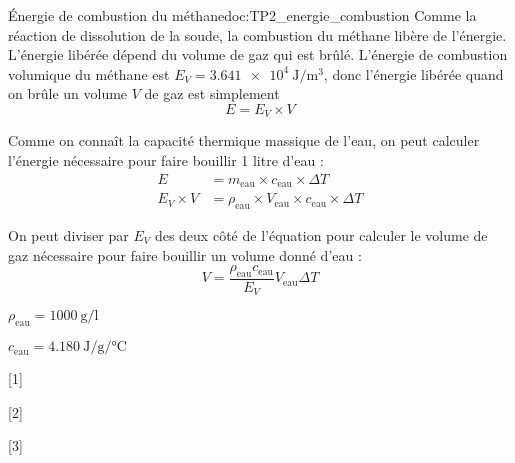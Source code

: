 \begin{doc}{Énergie de combustion du méthane}{doc:TP2_energie_combustion}
  Comme la réaction de dissolution de la soude, la combustion du méthane libère de l'énergie.
  L'énergie libérée dépend du volume de gaz qui est brûlé.
  L'énergie de combustion volumique du méthane est $E_V = \qty{3,641e4}{\joule\per\m\cubed}$, donc l'énergie libérée quand on brûle un volume $V$ de gaz est simplement 
  \begin{equation*}
    E = E_V \times V
  \end{equation*}

  Comme on connaît la capacité thermique massique de l'eau, on peut calculer l'énergie nécessaire pour faire bouillir 1 litre d'eau :
  \begin{align*}
    E &= m_\text{eau} \times c_\text{eau} \times \Delta T \\
    E_V \times V &= \rho_\text{eau} \times V_\text{eau} \times c_\text{eau} \times \Delta T
  \end{align*}

  On peut diviser par $E_V$ des deux côté de l'équation pour calculer le volume de gaz nécessaire pour faire bouillir un volume donné d'eau :
  \begin{equation*}
    V = \dfrac{\rho_\text{eau} c_\text{eau}}{E_V} V_\text{eau} \Delta T
  \end{equation*}

  \begin{donnees}
    \item $\rho_\text{eau} = \qty{1000}{\g\per\litre}$
    \item $c_\text{eau} = \qty{4,180}{\joule\per\g\per\degreeCelsius}$
  \end{donnees}
\end{doc}

[1]

[2]

[3]
